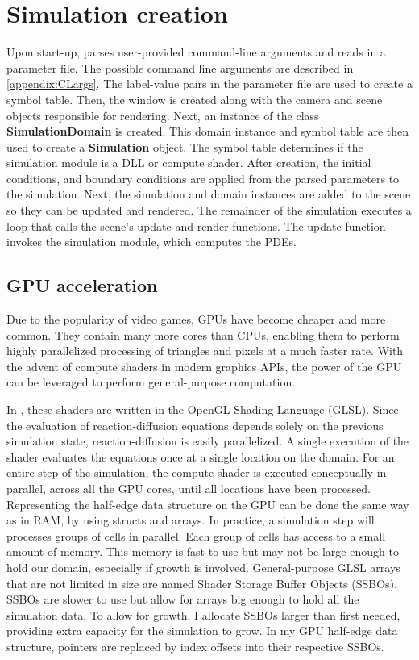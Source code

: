 \section{Simulation creation}
Upon start-up, \ProgramName{} parses user-provided command-line arguments and reads in a parameter file. The possible command line arguments are described in \ref{appendix:CLargs}. The label-value pairs in the parameter file are used to create a symbol table. Then, the window is created along with the camera and scene objects responsible for rendering. Next, an instance of the class \textbf{SimulationDomain} is created. This domain instance and symbol table are then used to create a \textbf{Simulation} object. The symbol table determines if the simulation module is a DLL or compute shader. After creation, the initial conditions, and boundary conditions are applied from the parsed parameters to the simulation. Next, the simulation and domain instances are added to the scene so they can be updated and rendered. The remainder of the simulation executes a loop that calls the scene's update and render functions. The update function invokes the simulation module, which computes the PDEs.

\subsection{GPU acceleration}
Due to the popularity of video games, GPUs have become cheaper and more common. They contain many more cores than CPUs, enabling them to perform highly parallelized processing of triangles and pixels at a much faster rate. With the advent of compute shaders in modern graphics APIs, the power of the GPU can be leveraged to perform general-purpose computation. 

In \ProgramName{}, these shaders are written in the OpenGL Shading Language (GLSL). Since the evaluation of reaction-diffusion equations depends solely on the previous simulation state, reaction-diffusion is easily parallelized. A single execution of the shader evaluates the equations once at a single location on the domain. For an entire step of the simulation, the compute shader is executed conceptually in parallel, across all the GPU cores, until all locations have been processed. Representing the half-edge data structure on the GPU can be done the same way as in RAM, by using structs and arrays. In practice, a simulation step will processes groups of cells in parallel. Each group of cells has access to a small amount of memory. This memory is fast to use but may not be large enough to hold our domain, especially if growth is involved. General-purpose GLSL arrays that are not limited in size are named Shader Storage Buffer Objects (SSBOs). SSBOs are slower to use but allow for arrays big enough to hold all the simulation data. To allow for growth, I allocate SSBOs larger than first needed, providing extra capacity for the simulation to grow. In my GPU half-edge data structure, pointers are replaced by index offsets into their respective SSBOs.


